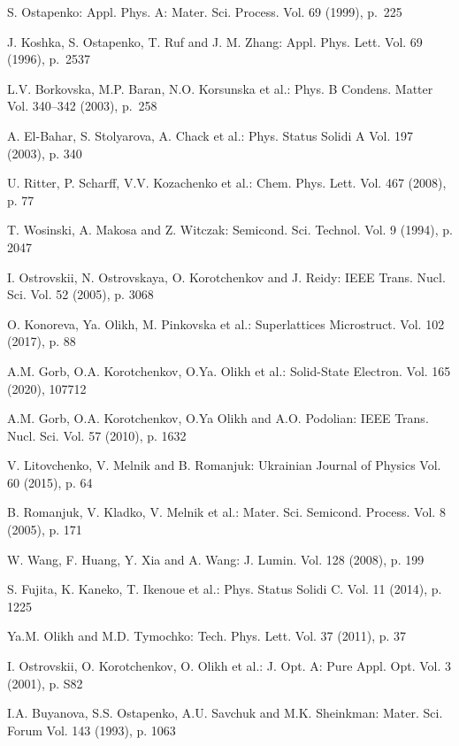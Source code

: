 \documentclass{ttp}
\begin{document}
\begin{thebibliography}{99}

 S. Ostapenko: Appl. Phys. A: Mater. Sci. Process. Vol. 69 (1999), p.~225

 J. Koshka, S. Ostapenko, T. Ruf and J. M. Zhang: Appl. Phys. Lett. Vol. 69 (1996), p.~2537

 L.V. Borkovska, M.P. Baran, N.O. Korsunska et al.: Phys. B Condens. Matter Vol. 340–342 (2003), p.~258

 A. El-Bahar, S. Stolyarova, A. Chack et al.: Phys. Status Solidi A Vol. 197 (2003), p. 340

 U. Ritter, P. Scharff, V.V. Kozachenko et al.: Chem. Phys. Lett. Vol. 467 (2008), p. 77

 T. Wosinski, A. Makosa and Z. Witczak: Semicond. Sci. Technol. Vol. 9 (1994), p. 2047

 I. Ostrovskii, N. Ostrovskaya, O. Korotchenkov and J. Reidy: IEEE Trans. Nucl. Sci. Vol. 52 (2005), p. 3068

 O. Konoreva, Ya. Olikh, M. Pinkovska et al.: Superlattices Microstruct. Vol. 102 (2017), p. 88

 A.M. Gorb, O.A. Korotchenkov, O.Ya. Olikh et al.: Solid-State Electron. Vol. 165 (2020), 107712

 A.M. Gorb, O.A. Korotchenkov, O.Ya Olikh and A.O. Podolian: IEEE Trans. Nucl. Sci. Vol. 57 (2010), p. 1632

 V. Litovchenko, V. Melnik and B. Romanjuk: Ukrainian Journal of Physics Vol. 60 (2015), p. 64

 B. Romanjuk, V. Kladko, V. Melnik et al.: Mater. Sci. Semicond. Process. Vol. 8 (2005), p. 171

 W. Wang, F. Huang, Y. Xia and A. Wang: J. Lumin. Vol. 128 (2008), p. 199

 S. Fujita, K. Kaneko, T. Ikenoue et al.: Phys. Status Solidi C. Vol. 11 (2014), p. 1225

 Ya.M. Olikh  and  M.D. Tymochko: Tech. Phys. Lett. Vol. 37 (2011), p. 37

 I. Ostrovskii, O. Korotchenkov, O. Olikh et al.: J. Opt. A: Pure Appl. Opt. Vol. 3 (2001), p. S82

 I.A. Buyanova, S.S. Ostapenko, A.U. Savchuk and M.K. Sheinkman: Mater. Sci. Forum Vol. 143 (1993), p. 1063


\end{thebibliography}
\end{document}
